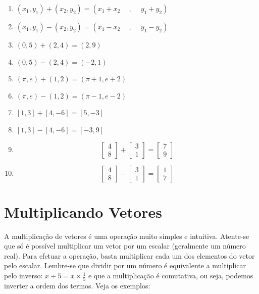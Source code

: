 \documentclass[
  letterpaper,
  DIV=11,
  numbers=noendperiod]{scrreprt}
\providecommand{\tightlist}{%
  \setlength{\itemsep}{0pt}\setlength{\parskip}{0pt}}\usepackage{longtable,booktabs,array}
\begin{document}
\begin{enumerate}
\def\labelenumi{\arabic{enumi}.}
\tightlist
\item
  \((x_1, y_1) + (x_2, y_2) = (x_1+x_2 \phantom{-}
  , \phantom{-} y_1 + y_2)\)
\item
  \((x_1, y_1) - (x_2, y_2) = (x_1-x_2 \phantom{-}
  , \phantom{-} y_1 - y_2)\)
\item
  \((0,5)+(2,4)=(2,9)\)
\item
  \((0,5)-(2,4)=(-2,1)\)
\item
  \((\pi, e)+(1,2) = (\pi+1, e+2)\)
\item
  \((\pi, e)-(1,2) = (\pi-1, e-2)\)
\item
  \([1,3]+[4,-6]=[5,-3]\)
\item
  \([1,3]-[4,-6]=[-3,9]\)
\item
  \[
  \begin{bmatrix} 4  \\  8 \end{bmatrix}+
  \begin{bmatrix} 3  \\  1 \end{bmatrix}=
  \begin{bmatrix} 7  \\  9 \end{bmatrix}
  \]
\item
  \[
  \begin{bmatrix} 4  \\  8 \end{bmatrix}-
  \begin{bmatrix} 3  \\  1 \end{bmatrix}=
  \begin{bmatrix} 1  \\  7 \end{bmatrix}
  \]
\end{enumerate}

\section{Multiplicando Vetores}\label{multiplicando-vetores}

A multiplicação de vetores é uma operação muito simples e intuitiva.
Atente-se que só é possível multiplicar um vetor por um escalar
(geralmente um número real). Para efetuar a operação, basta multiplicar
cada um dos elementos do vetor pelo escalar. Lembre-se que dividir por
um número é equivalente a multiplicar pelo inverso:
\(x \div 5 = x \times \frac{1}{5}\) e que a multiplicação é comutativa,
ou seja, podemos inverter a ordem dos termos. Veja os exemplos:
\end{document}
